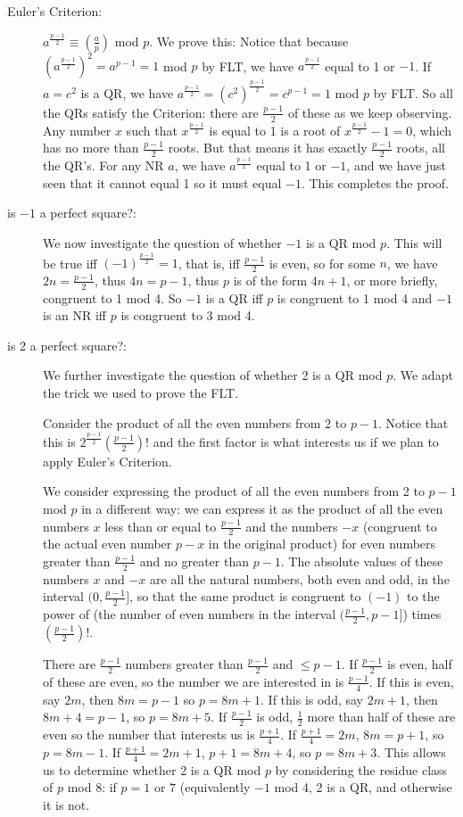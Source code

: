 \documentclass[12pt]{article}
\begin{document}
\begin{description}
\item[Euler's Criterion:]  $a^{\frac{p-1}2}\equiv \left(\frac ap\right)$ mod $p$.   We prove this:  Notice that because $(a^{\frac{p-1}2})^2=a^{p-1}=1$ mod $p$ by FLT, we have $a^{\frac{p-1}2}$ equal to 1 or $-1$.   If
$a=c^2$ is a QR, we have $a^{\frac{p-1}2}=(c^2)^{\frac{p-1}2}=c^{p-1}=1$ mod $p$ by FLT.   So all the QRs satisfy the Criterion:  there are $\frac{p-1}2$ of these as we keep observing.   Any number $x$ such that $x^{\frac{p-1}2}$ is equal to 1
is a root of $x^{\frac{p-1}2}-1=0$, which has no more than $\frac{p-1}2$ roots.   But that means it has exactly $\frac{p-1}2$ roots, all the QR's.   For any NR $a$, we have $a^{\frac{p-1}2}$ equal to 1 or $-1$, and we have just seen that it cannot equal 1 so it must equal $-1$.   This completes the proof.

\item[is $-1$ a perfect square?: ]  We now investigate the question of whether $-1$ is a QR mod $p$.   This will be true iff $(-1)^{\frac{p-1}2}=1$, that is, iff $\frac{p-1}2$ is even, so for some $n$, we have $2n=\frac{p-1}2$, thus $4n=p-1$, thus $p$ is of the form $4n+1$, or more briefly, congruent to 1 mod 4.  So $-1$ is a QR iff $p$ is congruent to 1 mod 4 and $-1$ is an NR iff $p$ is congruent to 3 mod 4.

\item[is 2 a perfect square?:] We further investigate the question of whether 2 is a QR mod $p$.   We adapt the trick we used to prove the FLT.   

Consider the product of all the even numbers from 2 to $p-1$.   Notice that this is $2^{\frac{p-1}2}(\frac{p-1}2)!$ and the first
factor is what interests us if we plan to apply Euler's Criterion.  

 We consider expressing the product of all the even numbers from 2 to $p-1$ mod $p$ in a different way:  we can express it as the product of all the even numbers $x$
less than or equal to $\frac{p-1}2$ and the numbers $-x$ (congruent to the actual even number $p-x$ in the original product) for even numbers greater than $\frac{p-1}2$ and no greater than $p-1$.   The absolute values of these numbers $x$ and $-x$ are all the natural numbers, both even and odd, in the interval $(0,\frac{p-1}2]$,  so that the same product is congruent to $(-1)$ to the power of (the number of even numbers in the interval $(\frac{p-1}2,p-1]$) times $(\frac{p-1}2)!$.  

There are $\frac{p-1}2$ numbers  greater than $\frac{p-1}2$ and $\leq p-1$.  If $\frac{p-1}2$ is even, half of these are even, so the number we are interested in is $\frac{p-1}4$.  If this is even, say $2m$, then $8m=p-1$ so
$p=8m+1$.   If this is odd, say $2m+1$, then $8m+4=p-1$, so $p=8m+5$.  If $\frac{p-1}2$ is odd, $\frac 12$ more than half of these are even so the number that interests us is $\frac{p+1}4$.  If $\frac{p+1}4=2m$,
$8m=p+1$, so $p=8m-1$.   If $\frac{p+1}4=2m+1$, $p+1=8m+4$, so $p=8m+3$.  This allows us to determine whether 2 is a QR mod $p$ by considering the residue class of $p$ mod 8:  if $p=1$ or $7 $ (equivalently $ -1$ mod 4, 2 is a QR,
and otherwise it is not.

 \end{description}
\end{document}
